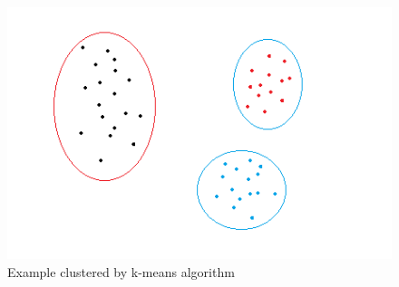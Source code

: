 \documentclass[a4paper,12pt]{report}
\begin{document}

\bigskip

\begin{figure}[h]
	\centering
	\includegraphics[scale=0.5]{./assets/cluster_seperate.png}
	\caption{Example clustered by k-means algorithm \cite{Yildirim2020}}
	\label{cluster_kmeans}
\end{figure}
\end{document}
